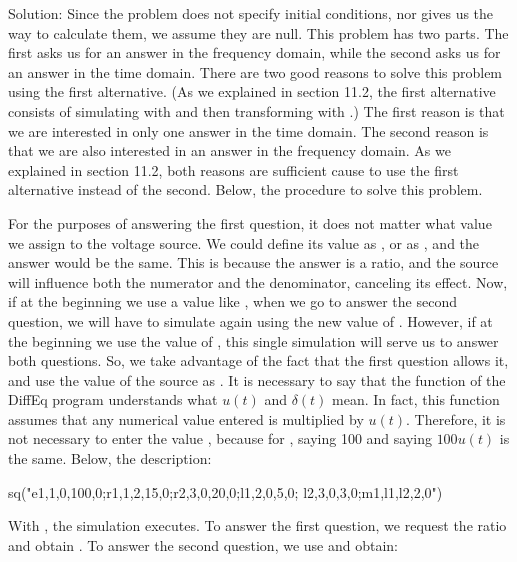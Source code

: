 Solution: Since the problem does not specify initial conditions, nor
gives us the way to calculate them, we assume they are null. This
problem has two parts. The first asks us for an answer in the
frequency domain, while the second asks us for an answer in the time
domain. There are two good reasons to solve this problem using the
first alternative. (As we explained in section 11.2, the first
alternative consists of simulating with  and then
transforming with .) The first reason is
that we are interested in only one answer in the time domain. The
second reason is that we are also interested in an answer in the
frequency domain. As we explained in section 11.2, both reasons are
sufficient cause to use the first alternative instead of the second.
Below, the procedure to solve this problem.

For the purposes of answering the first question, it does not matter
what value we assign to the voltage source. We could define its
value as , or as , and the answer would be
the same. This is because the answer is a ratio, and the source will
influence both the numerator and the denominator, canceling its
effect. Now, if at the beginning we use a value like , when
we go to answer the second question, we will have to simulate again
using the new value of . However, if at the beginning
we use the value of , this single simulation will
serve us to answer both questions. So, we take advantage of the fact
that the first question allows it, and use the value of the source
as . It is necessary to say that the 
function of the DiffEq program understands what $u(t)$ and
$\delta(t)$ mean. In fact, this function assumes that any numerical
value entered is multiplied by $u(t)$. Therefore, it is not
necessary to enter the value , because for
, saying 100 and saying $100u(t)$ is the same. Below,
the description:

\begin{entry}
sq\fd("e1,1,0,100,0;r1,1,2,15,0;r2,3,0,20,0;l1,2,0,5,0;
      l2,3,0,3,0;m1,l1,l2,2,0")
\end{entry}

With , the simulation executes. To answer the first
question, we request the ratio  and obtain
. To answer the second question, we
use  and obtain:


